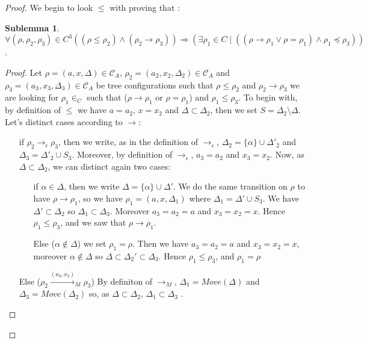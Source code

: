 \documentclass[a4paper,10pt]{report}
\newtheorem{slm}{Sublemma}[lm]
\newcommand{\C}{\mathcal{C}_{A}}
\begin{document}
\begin{proof}
  We begin to look $\leq$ with proving that :
  \begin{slm}
  $\forall (\rho,\rho_2,\rho_3) \in C^3  ((\rho \leq \rho_2) \wedge (\rho_2 \rightarrow \rho_3)) \Rightarrow (\exists \rho_1 \in C \mid ((\rho \rightarrow \rho_1 \vee \rho = \rho_1) \wedge \rho_1 \preceq \rho_3))$.
 
  \end{slm}
   \begin{proof}
   Let $\rho = (a,x,\Delta) \in \C$, $\rho_2 = (a_2,x_2,\Delta_2) \in \C$ and $\rho_3 = (a_3,x_3,\Delta_3) \in \C$ be tree configurations 
   such that $\rho \leq \rho_2$ and $\rho_2 \rightarrow \rho_3$ we are looking for $\rho_1 \in _C$ such that ($\rho \rightarrow \rho_1$ or $\rho = \rho_1$) and $\rho_1 \leq \rho_3$.
   To begin with, by definition of $\leq$ we have $a = a_2$, $x= x_2$ and $\Delta \subset \Delta_2$, then we set $S = \Delta_2 \setminus \Delta$. Let's distinct cases according to $\rightarrow$: 
   \begin{itemize}
    \item [if $\rho_2 \rightarrow_{\epsilon} \rho_3$,] 
    then we write, as in the definition of $\rightarrow_{\epsilon}$,  $\Delta_2 = \{\alpha \} \cup \Delta'_2$ and $\Delta_3 = \Delta'_2 \cup S_3$.
    Moreover, by definition of $\rightarrow_{\epsilon}$, $a_3 = a_2$ and $x_3 = x_2$.
    Now, as $\Delta \subset \Delta_2$, we can distinct again two cases:
      \begin{itemize}
	\item [if $\alpha \in \Delta$,] then we write $\Delta = \{\alpha \} \cup \Delta'$.  
	We do the same transition on $\rho$ to have $\rho \rightarrow \rho_1$, so we have $\rho_1 = (a,x,\Delta_1)$ where $\Delta_1 = \Delta' \cup S_3$. 
	We have $\Delta' \subset \Delta_2$ so $\Delta_1 \subset \Delta_3$.
	Moreover $a_3= a_2 = a$ and $x_3 = x_2 = x$.
	Hence $\rho_1 \leq \rho_3$, and we saw that $\rho \rightarrow \rho_1$.
	\item [Else ($\alpha \notin \Delta$)] we set $\rho_1 = \rho$. Then we have $a_3= a_2 = a$ and $x_3 = x_2 = x$, moreover $\alpha \notin \Delta $ so $\Delta \subset \Delta_2' \subset \Delta_3$.
	Hence $\rho_1 \leq \rho_3$, and $\rho_1 = \rho$ 
      \end{itemize}
     \item [Else ($\rho_2 \xrightarrow{(a_3,x_3)}_{M} \rho_3$)] By definiton of $\rightarrow_{M}$, $\Delta_1 = Move(\Delta)$ and $\Delta_3 = Move(\Delta_2)$ so,
     as $\Delta \subset \Delta_2$, $\Delta_1 \subset \Delta_3$ . 

\end{itemize}
\end{proof}
\end{proof}
\end{document}
